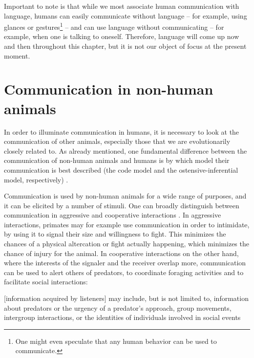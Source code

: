 Important to note is that while we most associate human communication with language, humans can easily communicate without language -- for example, using glances or gestures\footnote{One might even speculate that any human behavior can be used to communicate.} -- and can use language without communicating -- for example, when one is talking to oneself. Therefore, language will come up now and then throughout this chapter, but it is not our object of focus at the present moment.


\section{Communication in non-human animals}
\label{sec:comm:phylogeny}

In order to illuminate communication in humans, it is necessary to look at the communication of other animals, especially those that we are evolutionarily closely related to.
As already mentioned, one fundamental difference between the communication of non-human animals and humans is by which model their communication is best described (the code model and the ostensive-inferential model, respectively) \citep{Scott-Phillips15-primate, Scott-Phillips18-communication}.

Communication is used by non-human animals for a wide range of purposes, and it can be elicited by a number of stimuli.
One can broadly distinguish between communication in aggressive and cooperative interactions \citep{SeyfarthCheney03}. In aggressive interactions, primates may for example use communication in order to intimidate, by using it to signal their size and willingness to fight. This minimizes the chances of a physical altercation or fight actually happening, which minimizes the chance of injury for the animal.
In cooperative interactions on the other hand, where the interests of the signaler and the receiver overlap more, communication can be used to alert others of predators, to coordinate foraging activities and to facilitate social interactions:
\begin{quoting}
    {[information acquired by listeners]} may include, but is not limited to, information about predators or the urgency of a predator’s approach, group movements, intergroup interactions, or the identities of individuals involved in social events
    \hfill \citep[p.~168]{SeyfarthCheney03}
\end{quoting}

